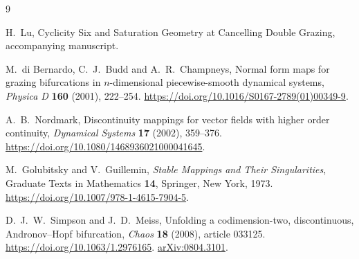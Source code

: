 \begin{thebibliography}{9}
\setlength{\itemsep}{1pt}

H.~Lu,
Cyclicity Six and Saturation Geometry at Cancelling Double Grazing,
accompanying manuscript.

M.~di Bernardo, C.~J.~Budd and A.~R.~Champneys,
Normal form maps for grazing bifurcations in \(n\)-dimensional
piecewise-smooth dynamical systems,
\emph{Physica D} \textbf{160} (2001), 222--254.
\url{https://doi.org/10.1016/S0167-2789(01)00349-9}.

A.~B.~Nordmark,
Discontinuity mappings for vector fields with higher order continuity,
\emph{Dynamical Systems} \textbf{17} (2002), 359--376.
\url{https://doi.org/10.1080/1468936021000041645}.

M.~Golubitsky and V.~Guillemin,
\emph{Stable Mappings and Their Singularities},
Graduate Texts in Mathematics \textbf{14}, Springer, New York, 1973.
\url{https://doi.org/10.1007/978-1-4615-7904-5}.

D.~J.~W.~Simpson and J.~D.~Meiss,
Unfolding a codimension-two, discontinuous, Andronov--Hopf bifurcation,
\emph{Chaos} \textbf{18} (2008), article 033125.
\url{https://doi.org/10.1063/1.2976165}.
\href{https://arxiv.org/abs/0804.3101}{arXiv:0804.3101}.

\end{thebibliography}
